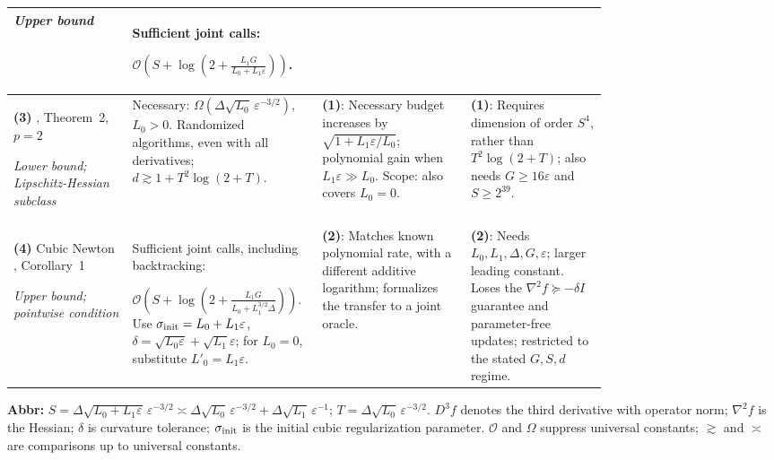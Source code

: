 \begin{table}[tp]
\begin{threeparttable}
\begin{tabularx}{\linewidth}{@{}>{\raggedright\arraybackslash}p{0.20\linewidth}>{\raggedright\arraybackslash}p{0.32\linewidth}>{\raggedright\arraybackslash}p{0.25\linewidth}>{\raggedright\arraybackslash}X@{}}
\textit{Upper bound}
& Sufficient joint calls:\par
$\mathcal{O}\!\left(S+\log\!\left(2+\frac{L_1G}{L_0+L_1\varepsilon}\right)\right)$.
& & \\
\midrule[1.2pt]
\textbf{(3)} \citep{sncCarmon2020v3}, Theorem~2, $p=2$\par
\textit{Lower bound; Lipschitz-Hessian subclass}
& Necessary: $\Omega(\Delta\sqrt{L_0}\,\varepsilon^{-3/2})$, $L_0>0$. Randomized algorithms, even with all derivatives; $d\gtrsim1+T^2\log(2+T)$.
& \textbf{(1)}: Necessary budget increases by $\sqrt{1+L_1\varepsilon/L_0}$; polynomial gain when $L_1\varepsilon\gg L_0$. Scope: also covers $L_0=0$.
& \textbf{(1)}: Requires dimension of order $S^4$, rather than $T^2\log(2+T)$; also needs $G\ge16\varepsilon$ and $S\ge2^{39}$. \\
\midrule
\textbf{(4)} Cubic Newton \citep{gdhFang2026v1}, Corollary~1\par
\textit{Upper bound; pointwise condition}
& Sufficient joint calls, including backtracking:\par
$\mathcal{O}\!\left(S+\log\!\left(2+\frac{L_1G}{L_0+L_1^{3/2}\Delta}\right)\right)$.
Use $\sigma_{\rm init}=L_0+L_1\varepsilon$, $\delta=\sqrt{L_0\varepsilon}+\sqrt{L_1}\varepsilon$; for $L_0=0$, substitute $L'_0=L_1\varepsilon$.
& \textbf{(2)}: Matches known polynomial rate, with a different additive logarithm; formalizes the transfer to a joint oracle.
& \textbf{(2)}: Needs $L_0,L_1,\Delta,G,\varepsilon$; larger leading constant. Loses the $\nabla^2f\succeq-\delta I$ guarantee and parameter-free updates; restricted to the stated $G,S,d$ regime. \\
\bottomrule
\end{tabularx}
\begin{tablenotes}[flushleft]\footnotesize
\item[] \textbf{Abbr:} $S=\Delta\sqrt{L_0+L_1\varepsilon}\,\varepsilon^{-3/2}\asymp\Delta\sqrt{L_0}\,\varepsilon^{-3/2}+\Delta\sqrt{L_1}\,\varepsilon^{-1}$; $T=\Delta\sqrt{L_0}\,\varepsilon^{-3/2}$. $D^3f$ denotes the third derivative with operator norm; $\nabla^2f$ is the Hessian; $\delta$ is curvature tolerance; $\sigma_{\rm init}$ is the initial cubic regularization parameter. $\mathcal{O}$ and $\Omega$ suppress universal constants; $\gtrsim$ and $\asymp$ are comparisons up to universal constants.
\end{tablenotes}
\end{threeparttable}
\end{table}
\clearpage
